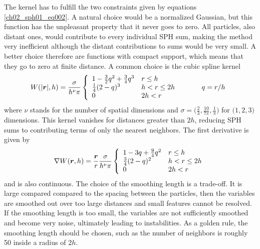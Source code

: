 The kernel has to fulfill the two constraints given by equations \ref{ch02_sph01_eq002}. A natural choice would be a normalized Gaussian, but this function has the unpleasant property that it never goes to zero. All particles, also distant ones, would contribute to every individual SPH sum, making the method very inefficient although the distant contributions to sums would be very small. A better choice therefore are functions with compact support, which means that they go to zero at finite distance. A common choice is the cubic spline kernel
\begin{equation}
\label{ch02_sph01_eq007}
W(| \boldsymbol{r} |, h) = \frac{\sigma}{h^\nu \pi} \left \{ \begin{array}{lll}
1 - \frac{3}{2}q^2 + \frac{3}{4}q^3 & r \leq h & \\
\frac{1}{4}(2-q)^3 & h < r  \leq 2h & \hspace{1.0cm} q = r / h\\
0 & 2h < r & \\
\end{array} \right. 
\end{equation}
where $\nu$ stands for the number of spatial dimensions and $\sigma = \big( \frac{2}{3}, \frac{10}{7\pi}, \frac{1}{\pi} \big) $ for $\big( 1,2,3\big)$ dimensions. This kernel vanishes for distances greater than $2h$, reducing SPH sums to contributing terms of only the nearest neighbors. The first derivative is given by 
\begin{equation}
\label{ch02_sph01_eq008}
\nabla W(\boldsymbol{r}, h) = \frac{\boldsymbol{r}}{r} \frac{\sigma}{h^\nu \pi} \left \{ \begin{array}{ll}
1 - 3q + \frac{9}{4}q^2 & r \leq h \\
\frac{3}{4}(2-q)^2 & h < r  \leq 2h \\
0 & 2h < r \\
\end{array} \right. 
\end{equation}
and is also continuous. 
The choice of the smoothing length is a trade-off. It is large compared compared to the spacing between the particles, then the variables are smoothed out over too large distances and small features cannot be resolved. If the smoothing length is too small, the variables are not sufficiently smoothed and become very noise, ultimately leading to instabilities. As a golden rule, the smoothing length should be chosen, such as the number of neighbors is roughly 50 inside a radius of $2h$.

